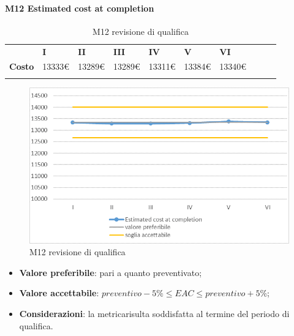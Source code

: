 \paragraph{M12 Estimated cost at completion} \mbox{}
\begin{longtable}[H!] {						
		>{}p{25mm}  		
		>{}p{12mm}
		>{}p{12mm}		
		>{}p{12mm}		
		>{}p{12mm}		
		>{}p{12mm}		
		>{}p{12mm}
		>{}p{12mm}
		>{}p{12mm}
		>{}p{12mm}
	}
	\rowcolor{gray!50}
	\textbf{} & \textbf{I} & \textbf{II} & \textbf{III} & \textbf{IV} & \textbf{V} & \textbf{VI} \TBstrut \\ [2mm]
	\textbf{Costo} & 13333\euro & 13289\euro & 13289\euro & 13311\euro & 13384\euro & 13340\euro \TBstrut \\ [2mm]
	\rowcolor{white}
	\caption{M12 revisione di qualifica}
\end{longtable}
\begin{figure}[H] 	
	\includegraphics[width=\linewidth]{./img/grafici/RQ12.png}	
	\caption{M12 revisione di qualifica}	
\end{figure}
\begin{itemize}
	\item \textbf{Valore preferibile}: pari a quanto preventivato;
	\item \textbf{Valore accettabile}: $preventivo-5\% \le EAC \le preventivo+5\%$;
	\item \textbf{Considerazioni}: la metrica\glosp risulta soddisfatta al termine del periodo di qualifica.
\end{itemize}


